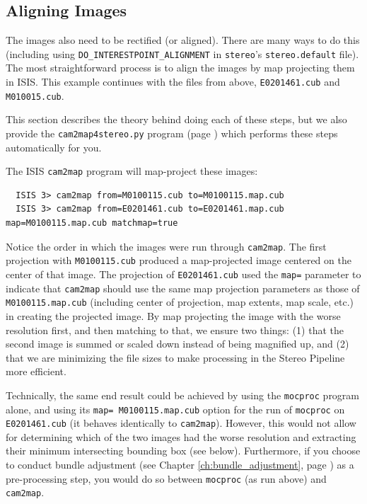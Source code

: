 \subsection{Aligning Images}
\label{sec:AligningImages}

The images also need to be rectified (or aligned).  There are many
ways to do this (including using \texttt{DO\_INTERESTPOINT\_ALIGNMENT}
in \texttt{stereo}'s \texttt{stereo.default} file).  The most
straightforward process is to align the images by map projecting
them in \ac{ISIS}. This example continues with the files from above,
\texttt{E0201461.cub} and \texttt{M010015.cub}.

This section describes the theory behind doing each of these steps,
but we also provide the \texttt{cam2map4stereo.py} program (page
\pageref{cam2map4stereo}) which performs these steps automatically
for you.

The \ac{ISIS} \texttt{cam2map} program will map-project these images:

\begin{verbatim}
  ISIS 3> cam2map from=M0100115.cub to=M0100115.map.cub
  ISIS 3> cam2map from=E0201461.cub to=E0201461.map.cub map=M0100115.map.cub matchmap=true
\end{verbatim}

Notice the order in which the images were run through
\texttt{cam2map}.  The first projection with \texttt{M0100115.cub}
produced a map-projected image centered on the center of that image.
The projection of \texttt{E0201461.cub} used the \texttt{map=}
parameter to indicate that \texttt{cam2map} should use the same map
projection parameters as those of \texttt{M0100115.map.cub} (including
center of projection, map extents, map scale, etc.) in creating the
projected image.  By map projecting the image with the worse
resolution first, and then matching to that, we ensure two things: (1)
that the second image is summed or scaled down instead of being
magnified up, and (2) that we are minimizing the file sizes to make
processing in the Stereo Pipeline more efficient.

Technically, the same end result could be achieved by using the
\texttt{mocproc} program alone, and using its \texttt{map=
M0100115.map.cub} option for the run of \texttt{mocproc} on
\texttt{E0201461.cub} (it behaves identically to \texttt{cam2map}).
However, this would not allow for determining which of the two
images had the worse resolution and extracting their minimum
intersecting bounding box (see below).  Furthermore, if you choose
to conduct bundle adjustment (see Chapter \ref{ch:bundle_adjustment},
page \pageref{ch:bundle_adjustment}) as a pre-processing step, you
would do so between \texttt{mocproc} (as run above) and \texttt{cam2map}.

